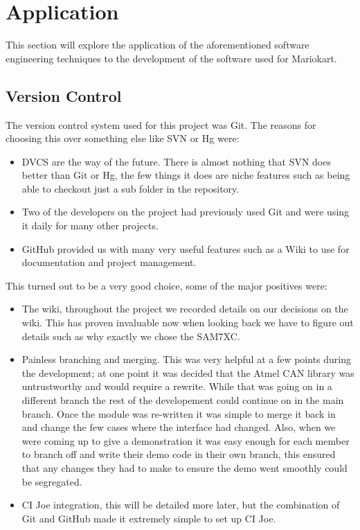 \section{Application}

  This section will explore the application of the aforementioned software
  engineering techniques to the development of the software used for Mariokart.

  \subsection{Version Control}

    The version control system used for this project was Git.  The reasons for
    choosing this over something else like SVN or Hg were:

    \begin{itemize}
      \item DVCS are the way of the future.  There is almost nothing that SVN
      does better than Git or Hg, the few things it does are niche features such
      as being able to checkout just a sub folder in the repository.

      \item Two of the developers on the project had previously used Git and
      were using it daily for many other projects.

      \item GitHub provided us with many very useful features such as a Wiki to
      use for documentation and project management.
    \end{itemize}

    This turned out to be a very good choice, some of the major positives were:

    \begin{itemize}
      \item The wiki, throughout the project we recorded details on our
      decisions on the wiki.  This has proven invaluable now when looking back
      we have to figure out details such as why exactly we chose the SAM7XC.

      \item Painless branching and merging.  This was very helpful at a few
      points during the development; at one point it was decided that the Atmel
      CAN library was untrustworthy and would require a rewrite.  While that was
      going on in a different branch the rest of the developement could continue
      on in the main branch.  Once the module was re-written it was simple to
      merge it back in and change the few cases where the interface had changed.
      Also, when we were coming up to give a demonstration it was easy enough
      for each member to branch off and write their demo code in their own
      branch, this ensured that any changes they had to make to ensure the demo
      went smoothly could be segregated.

      \item CI Joe integration, this will be detailed more later, but the
      combination of Git and GitHub made it extremely simple to set up CI Joe.
    \end{itemize}

